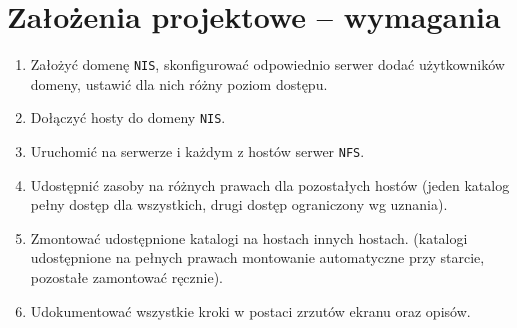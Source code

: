 \section{Założenia projektowe – wymagania}		%
\begin{enumerate}
\item Założyć domenę \texttt{NIS}, skonfigurować odpowiednio serwer dodać użytkowników domeny, ustawić dla nich różny poziom dostępu.
\item Dołączyć hosty do domeny \texttt{NIS}.
\item Uruchomić na serwerze i każdym z hostów serwer \texttt{NFS}.
\item Udostępnić zasoby na różnych prawach dla pozostałych hostów (jeden katalog pełny dostęp dla wszystkich, drugi dostęp ograniczony wg uznania).
\item Zmontować udostępnione katalogi na hostach innych hostach. (katalogi udostępnione na pełnych prawach montowanie automatyczne przy starcie, pozostałe zamontować ręcznie).
\item Udokumentować wszystkie kroki w postaci zrzutów ekranu oraz opisów. 
\end{enumerate}
